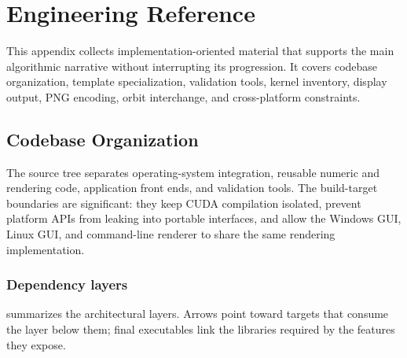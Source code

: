 \section{Engineering Reference}
\label{sec:engineering-reference}

This appendix collects implementation-oriented material that supports the main
algorithmic narrative without interrupting its progression.  It covers codebase
organization, template specialization, validation tools, kernel inventory,
display output, PNG encoding, orbit interchange, and cross-platform constraints.

\subsection{Codebase Organization}
\label{sec:code-organization}

The source tree separates operating-system integration, reusable numeric and
rendering code, application front ends, and validation tools.  The build-target
boundaries are significant: they keep CUDA compilation isolated, prevent
platform APIs from leaking into portable interfaces, and allow the Windows GUI,
Linux GUI, and command-line renderer to share the same rendering implementation.

\subsubsection{Dependency layers}

 summarizes the architectural layers.  Arrows point
toward targets that consume the layer below them; final executables link the
libraries required by the features they expose.

